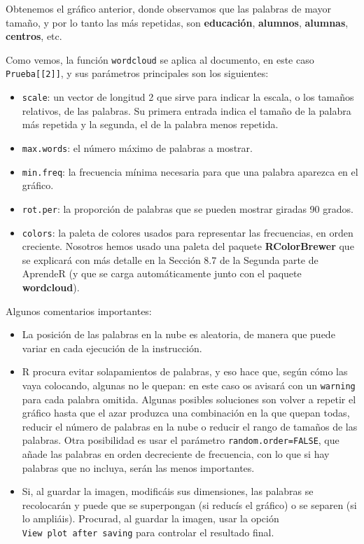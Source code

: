 \documentclass[
]{book}
\theoremstyle{definition}
\theoremstyle{definition}
\theoremstyle{definition}
\theoremstyle{remark}
\begin{document}
Obtenemos el gráfico anterior, donde observamos que las palabras de mayor tamaño, y por lo tanto las más repetidas, son \textbf{educación}, \textbf{alumnos}, \textbf{alumnas}, \textbf{centros}, etc.

Como vemos, la función \texttt{wordcloud} se aplica al documento, en este caso \texttt{Prueba{[}{[}2{]}{]}}, y
sus parámetros principales son los siguientes:

\begin{itemize}
\item
  \texttt{scale}: un vector de longitud 2 que sirve para indicar la escala, o los tamaños relativos, de las palabras. Su primera entrada indica el tamaño de la palabra más repetida y la segunda, el de la palabra menos repetida.
\item
  \texttt{max.words}: el número máximo de palabras a mostrar.
\item
  \texttt{min.freq}: la frecuencia mínima necesaria para que una palabra aparezca en el gráfico.
\item
  \texttt{rot.per}: la proporción de palabras que se pueden mostrar giradas 90 grados.
\item
  \texttt{colors}: la paleta de colores usados para representar las frecuencias, en orden creciente. Nosotros hemos usado una paleta del paquete \textbf{RColorBrewer} que se explicará con más detalle en la Sección 8.7 de la Segunda parte de AprendeR (y que se carga automáticamente junto con el paquete \textbf{wordcloud}).
\end{itemize}

Algunos comentarios importantes:

\begin{itemize}
\item
  La posición de las palabras en la nube es aleatoria, de manera que puede variar en cada ejecución de la instrucción.
\item
  R procura evitar solapamientos de palabras, y eso hace que, según cómo las vaya colocando, algunas no le quepan: en este caso os avisará con un \texttt{warning} para cada palabra omitida. Algunas posibles soluciones son volver a repetir el gráfico hasta que el azar produzca una combinación en la que quepan todas, reducir el número de palabras en la nube o reducir el rango de tamaños de las palabras. Otra posibilidad es usar el parámetro
  \texttt{random.order=FALSE}, que añade las palabras en orden decreciente de frecuencia, con lo que si hay palabras que no incluya, serán las menos importantes.
\item
  Si, al guardar la imagen, modificáis sus dimensiones, las palabras se recolocarán y puede que se superpongan (si reducís el gráfico) o se separen (si lo ampliáis). Procurad, al guardar la imagen, usar la opción \texttt{View\ plot\ after\ saving} para controlar el resultado final.
\end{itemize}
\end{document}
